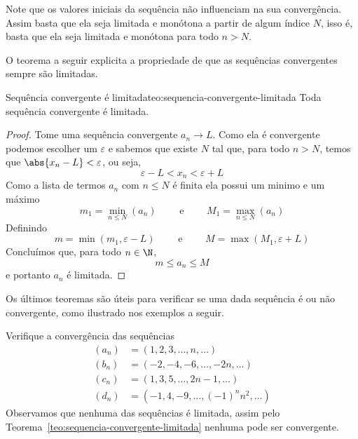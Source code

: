 Note que os valores iniciais da sequência não influenciam na sua convergência.
Assim basta que ela seja limitada e monótona a partir de algum índice $N$,
isso é, basta que ela seja limitada e monótona para todo $n>N$.

O teorema a seguir explicita a propriedade de que as sequências convergentes
sempre são limitadas.

\begin{teorema}{Sequência convergente é limitada}{teo:sequencia-convergente-limitada}
  Toda sequência convergente é limitada.
\end{teorema}

\begin{proof}
  Tome uma sequência convergente $a_n\to L$.
  Como ela é convergente podemos escolher um $\varepsilon$ e sabemos que
  existe $N$ tal que, para todo $n>N$, temos que $\abs{x_n-L}<\varepsilon$,
  ou seja,
  \[
    \varepsilon - L < x_n < \varepsilon + L
  \]
  Como a lista de termos $a_n$ com $n\leq N$ é finita ela possui um
  minimo e um máximo
  \[
    m_1 = \min_{n\leq N}(a_n) \qquad\text{ e }\qquad
    M_1 = \max_{n\leq N}(a_n)
  \]
  Definindo
  \[
    m = \min(m_1, \varepsilon - L) \qquad\text{ e }\qquad
    M = \max(M_1, \varepsilon + L)
  \]
  Concluímos que, para todo $n\in\N$,
  \[
    m \leq a_n \leq M
  \]
  e portanto $a_n$ é limitada.
\end{proof}

Os últimos teoremas são úteis para verificar se uma dada sequência é ou não convergente,
como ilustrado nos exemplos a seguir.

\begin{example}
  Verifique a convergência das sequências
  \begin{align*}
    (a_n) & = ( 1,  2,  3, \dots,         n, \dots) \\
    (b_n) & = (-2, -4, -6, \dots,       -2n, \dots) \\
    (c_n) & = ( 1,  3,  5, \dots,      2n-1, \dots) \\
    (d_n) & = (-1,  4, -9, \dots, (-1)^nn^2, \dots)
  \end{align*}
  \solution
  Observamos que nenhuma das sequências é limitada, assim pelo
  Teorema~\ref{teo:sequencia-convergente-limitada} nenhuma pode ser
  convergente.
\end{example}

